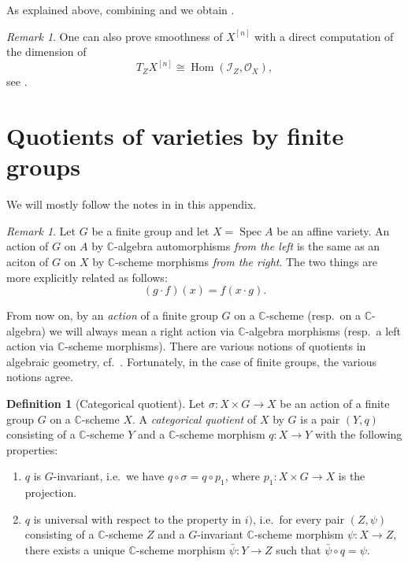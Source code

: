 \documentclass[12pt,a4paper]{amsart}
\theoremstyle{plain}
\theoremstyle{definition}
\newtheorem{defn}[thm]{Definition}
\theoremstyle{remark}
\newtheorem{rem}[thm]{Remark}
\begin{document}
As explained above, combining  and  we obtain .

\begin{rem}
  One can also prove smoothness of $X^{[n]}$ with a direct computation of the dimension of
  \[ T_{Z}X^{[n]} \cong \operatorname{Hom}(\mathscr{I}_{Z}, \mathscr{O}_{X}), \]
  see \cite[Example 4.5.10]{hl97}.
\end{rem}

\appendix

\section{Quotients of varieties by finite groups}\label{sec:quotient}

We will mostly follow the notes in \cite[Appendix A]{mus11} in this appendix.

\begin{rem}
  Let $G$ be a finite group and let $X = \operatorname{Spec}{A}$ be an affine variety.
  An action of $G$ on $A$ by $\mathbb{C}$-algebra automorphisms \textit{from the left} is the same as an aciton of $G$ on $X$ by $\mathbb{C}$-scheme morphisms \textit{from the right}.
  The two things are more explicitly related as follows:
  \[ (g \cdot f)(x) = f(x \cdot g). \]
\end{rem}

From now on, by an \textit{action} of a finite group $G$ on a $\mathbb{C}$-scheme (resp.~on a $\mathbb{C}$-algebra) we will always mean a right action via $\mathbb{C}$-algebra morphisms (resp.~a left action via $\mathbb{C}$-scheme morphisms).
There are various notions of quotients in algebraic geometry, cf.~\cite[\S 0.1]{mfk94}.
Fortunately, in the case of finite groups, the various notions agree.

\begin{defn}[Categorical quotient]
  Let $\sigma \colon X \times G \to X$ be an action of a finite group $G$ on a $\mathbb{C}$-scheme $X$.
  A \textit{categorical quotient} of $X$ by $G$ is a pair $(Y,q)$ consisting of a $\mathbb{C}$-scheme $Y$ and a $\mathbb{C}$-scheme morphism $q \colon X \to Y$ with the following properties:
  \begin{enumerate}[label=\roman*)]
    \item $q$ is $G$-invariant, i.e.~we have $q \circ \sigma = q \circ p_{1}$, where $p_{1} \colon X \times G \to X$ is the projection.
    \item $q$ is universal with respect to the property in $i)$, i.e.~for every pair $(Z,\psi)$ consisting of a $\mathbb{C}$-scheme $Z$ and a $G$-invariant $\mathbb{C}$-scheme morphism $\psi \colon X \to Z$, there exists a unique $\mathbb{C}$-scheme morphism $\bar{\psi} \colon Y \to Z$ such that $\bar{\psi} \circ q = \psi$.
  \end{enumerate}
\end{defn}
\end{document}
